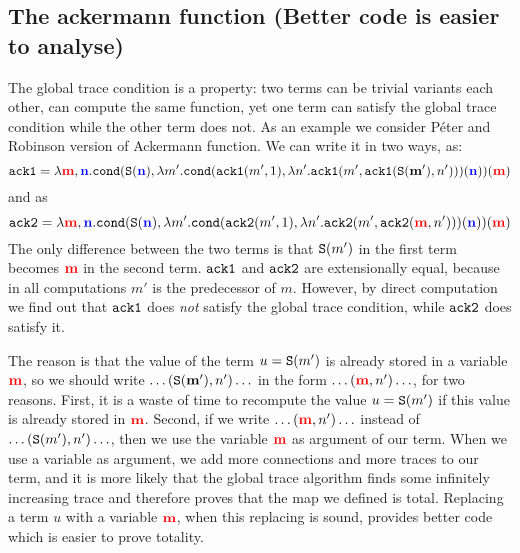 \subsection{The ackermann function (Better code is easier to analyse)}
The global trace condition is a  property: two
terms can be trivial variants each other, can compute the same function, yet
one term can satisfy the global trace condition while the other term does not.
As an example we consider Péter and Robinson version of Ackermann function. We can write it in two ways, as:
  \[
  {\tt ack1} = \lambda {{\bf \color{red}{m}}}, {{\bf \color{blue}{n}}}.{\tt cond}({\tt S}({{\bf \color{blue}{n}}}),\lambda m'.{\tt cond}({\tt ack1}(m',1),\lambda n'.{\tt ack1}(m',{\tt ack1}(\mathbf{{\tt S}(m')},n')))({{\bf \color{blue}{n}}}))({{\bf \color{red}{m}}})
  \]
and as 
  \[
  {\tt ack2} = \lambda {{\bf \color{red}{m}}}, {{\bf \color{blue}{n}}}.
{\tt cond}({\tt S}({{\bf \color{blue}{n}}}),\lambda m'.{\tt cond}({\tt ack2}(m',1),\lambda n'.{\tt ack2}(m',{\tt ack2}({{\bf \color{red}{m}}},n')))({{\bf \color{blue}{n}}}))({{\bf \color{red}{m}}})
  \]
The only difference between the two terms is that ${\tt S}(m')$ in the first
term becomes ${{\bf \color{red}{m}}}$ in the second term. ${\tt ack1}$ and ${\tt ack2}$ are 
extensionally equal, because in all computations $m'$ is the predecessor of $m$. 
However, by direct computation we find out that 
${\tt ack1}$ does \emph{not} satisfy the global trace condition, while ${\tt ack2}$ does
satisfy it. 

The reason is that the value of the term $u= {\tt S}(m')$ is already stored in a 
variable ${{\bf \color{red}{m}}}$, so we should write $\ldots (\mathbf{{\tt S}(m')},n') \ldots$ in the 
form  $\ldots ({{\bf \color{red}{m}}},n') \ldots$, for two reasons.
First, it is a waste of time to recompute the value $u= {\tt S}(m')$ if this value is 
already stored in ${{\bf \color{red}{m}}}$. Second, if we write $\ldots ({{\bf \color{red}{m}}},n') \ldots$ instead of 
$\ldots ({\tt S}(m'),n') \ldots$, then we use the variable ${{\bf \color{red}{m}}}$ as argument of our
term. When we use a variable as argument, we add more connections and 
more traces to our term, and it is more likely that the global trace algorithm finds 
some infinitely increasing trace and therefore proves that the map we defined is 
total. Replacing  a term $u$ with a variable ${{\bf \color{red}{m}}}$, when this replacing is sound, 
provides better code which is easier to prove totality.
